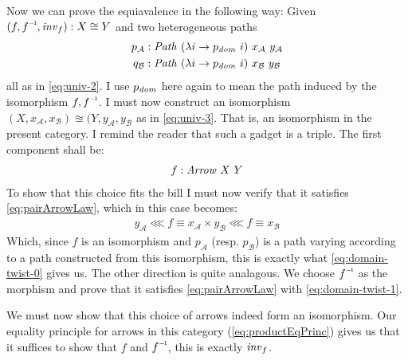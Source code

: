 Now we can prove the equiavalence in the following way: Given $(f, \inv{f},
\var{inv}_f) \tp X \cong Y$ and two heterogeneous paths
%
\begin{align*}
p_\mathcal{A} & \tp \Path\ (\lambda i \to p_\var{dom}\ i)\ x_\mathcal{A}\ y_\mathcal{A}\\
%
q_\mathcal{B} & \tp \Path\ (\lambda i \to p_\var{dom}\ i)\ x_\mathcal{B}\ y_\mathcal{B}
\end{align*}
%
all as in \ref{eq:univ-2}. I use $p_{\mathit{dom}}$ here again to mean the path
induced by the isomorphism $f, \inv{f}$. I must now construct an isomorphism
$(X, x_\mathcal{A}, x_\mathcal{B}) \approxeq (Y, y_\mathcal{A}, y_\mathcal{B}$
as in \ref{eq:univ-3}. That is, an isomorphism in the present category. I remind
the reader that such a gadget is a triple. The first component shall be:
%
\begin{align}
f \mathrel{:} \mathit{Arrow}\ X\ Y
\end{align}
%
To show that this choice fits the bill I must now verify that it satisfies
\ref{eq:pairArrowLaw}, which in this case becomes:
%
\begin{align}
y_\mathcal{A} \lll f ≡ x_\mathcal{A} × y_\mathcal{B} \lll f ≡ x_\mathcal{B}
\end{align}
%
Which, since $f$ is an isomorphism and $p_\mathcal{A}$ (resp. $p_\mathcal{B}$)
is a path varying according to a path constructed from this isomorphism, this is
exactly what \ref{eq:domain-twist-0} gives us.
%
The other direction is quite analagous. We choose $\inv{f}$ as the morphism and
prove that it satisfies \ref{eq:pairArrowLaw} with \ref{eq:domain-twist-1}.

We must now show that this choice of arrows indeed form an isomorphism. Our
equality principle for arrows in this category (\ref{eq:productEqPrinc}) gives
us that it suffices to show that $f$ and $\inv{f}$, this is exactly
$\mathit{inv}_f$.

